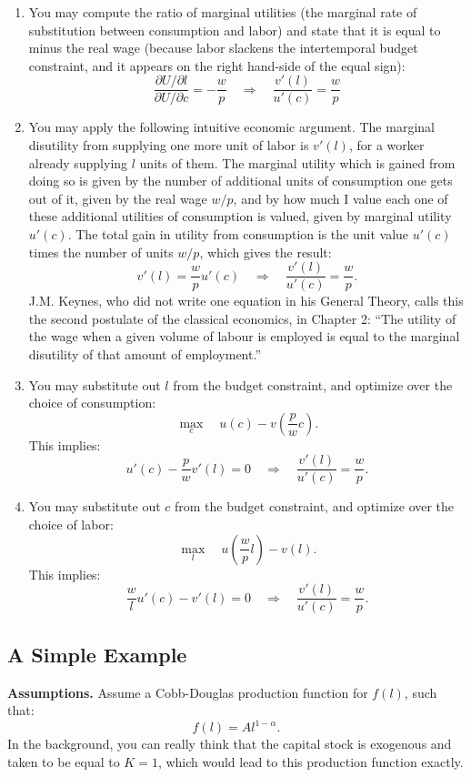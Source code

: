 \documentclass[]{book}
\theoremstyle{definition}
\theoremstyle{definition}
\theoremstyle{definition}
\theoremstyle{remark}
\begin{document}
\begin{enumerate}
\def\labelenumi{\arabic{enumi}.}
\item
  You may compute the ratio of marginal utilities (the marginal rate of
  substitution between consumption and labor) and state that it is equal
  to minus the real wage (because labor slackens the intertemporal
  budget constraint, and it appears on the right hand-side of the equal
  sign):
  \[\frac{\partial U / \partial l}{\partial U / \partial c} = -\frac{w}{p} \quad\Rightarrow\quad \boxed{\frac{v'(l)}{u'(c)}=\frac{w}{p}}\]
\item
  You may apply the following intuitive economic argument. The marginal
  disutility from supplying one more unit of labor is \(v'(l)\), for a
  worker already supplying \(l\) units of them. The marginal utility
  which is gained from doing so is given by the number of additional
  units of consumption one gets out of it, given by the real wage
  \(w/p\), and by how much I value each one of these additional
  utilities of consumption is valued, given by marginal utility
  \(u'(c)\). The total gain in utility from consumption is the unit
  value \(u'(c)\) times the number of units \(w/p\), which gives the
  result:
  \[v'(l)=\frac{w}{p}u'(c)\quad \Rightarrow \quad \boxed{\frac{v'(l)}{u'(c)}=\frac{w}{p}.}\]
  J.M. Keynes, who did not write one equation in his General Theory,
  calls this the second postulate of the classical economics, in Chapter
  2: ``The utility of the wage when a given volume of labour is employed
  is equal to the marginal disutility of that amount of employment.''
\item
  You may substitute out \(l\) from the budget constraint, and optimize
  over the choice of consumption:
  \[\max_c \quad u(c)-v\left(\frac{p}{w} c\right).\] This implies:
  \[u'(c)-\frac{p}{w}v'(l)=0 \quad \Rightarrow \quad \frac{v'(l)}{u'(c)}=\frac{w}{p}.\]
\item
  You may substitute out \(c\) from the budget constraint, and optimize
  over the choice of labor:
  \[\max_l \quad u\left(\frac{w}{p}l\right)-v(l).\] This implies:
  \[\frac{w}{l}u'(c)-v'(l)=0 \quad \Rightarrow \quad \boxed{\frac{v'(l)}{u'(c)}=\frac{w}{p}}.\]
\end{enumerate}

\subsection{A Simple Example}\label{a-simple-example}

\textbf{Assumptions.} Assume a Cobb-Douglas production function for
\(f(l)\), such that: \[f(l)=A l^{1-\alpha}.\] In the background, you can
really think that the capital stock is exogenous and taken to be equal
to \(K=1\), which would lead to this production function exactly.
\end{document}
